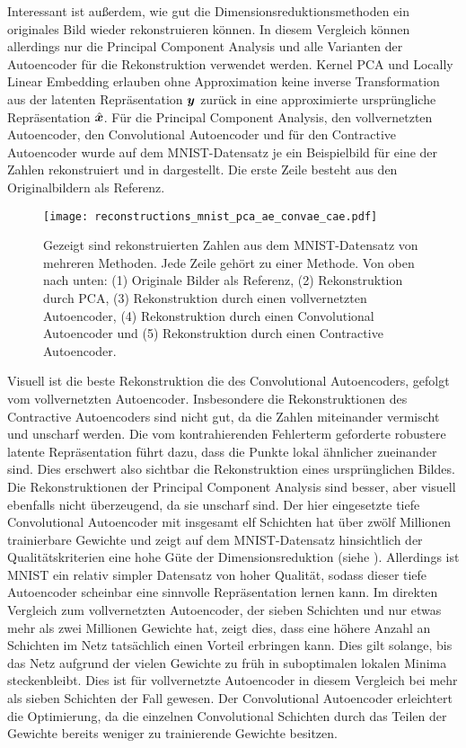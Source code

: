 Interessant ist außerdem, wie gut die Dimensionsreduktionsmethoden ein originales Bild wieder
rekonstruieren können. In diesem Vergleich können allerdings nur die Principal Component Analysis
und alle Varianten der Autoencoder für die Rekonstruktion verwendet werden. Kernel PCA und Locally
Linear Embedding erlauben ohne Approximation keine inverse Transformation aus der latenten
Repräsentation $\bm{y}$ zurück in eine approximierte ursprüngliche Repräsentation
$\hat{\bm{x}}$. Für die Principal Component Analysis, den vollvernetzten Autoencoder, den
Convolutional Autoencoder und für den Contractive Autoencoder wurde auf dem MNIST-Datensatz je ein
Beispielbild für eine der Zahlen rekonstruiert und in 
dargestellt. Die erste Zeile besteht aus den Originalbildern als Referenz.
\begin{figure}[ht]
	\centering
	\texttt{[image: reconstructions\_mnist\_pca\_ae\_convae\_cae.pdf]}
	\caption[Rekonstruierte MNIST-Zahlen]{Gezeigt sind rekonstruierten Zahlen aus dem MNIST-Datensatz von mehreren Methoden. Jede Zeile gehört zu einer Methode. Von oben nach unten: (1) Originale Bilder als Referenz, (2) Rekonstruktion durch PCA, (3) Rekonstruktion durch einen vollvernetzten Autoencoder, (4) Rekonstruktion durch einen Convolutional Autoencoder und (5) Rekonstruktion durch einen Contractive Autoencoder.}
	\label{fig:MNIST-reconstructions}
\end{figure}
Visuell ist die beste Rekonstruktion die des Convolutional Autoencoders, gefolgt vom vollvernetzten Autoencoder. Insbesondere die Rekonstruktionen des Contractive Autoencoders sind nicht gut, da die Zahlen miteinander vermischt und unscharf werden. Die vom kontrahierenden Fehlerterm geforderte robustere latente Repräsentation führt dazu, dass die Punkte lokal ähnlicher zueinander sind. Dies erschwert also sichtbar die Rekonstruktion eines ursprünglichen Bildes. Die Rekonstruktionen der Principal Component Analysis sind besser, aber visuell ebenfalls nicht überzeugend, da sie unscharf sind. Der hier eingesetzte tiefe Convolutional Autoencoder mit insgesamt elf Schichten hat über zwölf Millionen trainierbare Gewichte und zeigt auf dem MNIST-Datensatz hinsichtlich der Qualitätskriterien eine hohe Güte der Dimensionsreduktion (siehe ). Allerdings ist MNIST ein relativ simpler Datensatz von hoher Qualität, sodass dieser tiefe Autoencoder scheinbar eine sinnvolle Repräsentation lernen kann. Im direkten Vergleich zum vollvernetzten Autoencoder, der sieben Schichten und nur etwas mehr als zwei Millionen Gewichte hat, zeigt dies, dass eine höhere Anzahl an Schichten im Netz tatsächlich einen Vorteil erbringen kann. Dies gilt solange, bis das Netz aufgrund der vielen Gewichte zu früh in suboptimalen lokalen Minima steckenbleibt. Dies ist für vollvernetzte Autoencoder in diesem Vergleich bei mehr als sieben Schichten der Fall gewesen. Der Convolutional Autoencoder erleichtert die Optimierung, da die einzelnen Convolutional Schichten durch das Teilen der Gewichte bereits weniger zu trainierende Gewichte besitzen.

